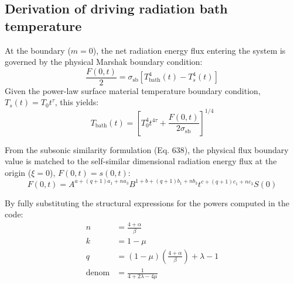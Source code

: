\documentclass[11pt]{article}
\begin{document}
\subsection*{Derivation of driving radiation bath temperature}

At the boundary ($m=0$), the net radiation energy flux entering the system is governed by the physical Marshak boundary condition:
\begin{equation}
    \frac{F(0, t)}{2} = \sigma_{\text{sb}} \left[ T_{\text{bath}}^4(t) - T_s^4(t) \right]
\end{equation}
Given the power-law surface material temperature boundary condition, $T_s(t) = T_0 t^\tau$, this yields:
\begin{equation}
    T_{\text{bath}}(t) = \left[ T_0^4 t^{4\tau} + \frac{F(0, t)}{2\sigma_{\text{sb}}} \right]^{1/4}
\end{equation}

From the subsonic similarity formulation (Eq. 638), the physical flux boundary value is matched to the self-similar dimensional radiation energy flux at the origin ($\xi = 0$), $F(0,t) = s(0,t)$:
\begin{equation}
    F(0, t) = A^{a + (q+1)a_1 + n a_3} B^{1 + b + (q+1)b_1 + n b_3} t^{c + (q+1)c_1 + n c_3} S(0)
\end{equation}

By fully substituting the structural expressions for the powers computed in the code:
\begin{align*}
    n &= \frac{4+\alpha}{\beta} \\
    k &= 1 - \mu \\
    q &= (1 - \mu)\left(\frac{4+\alpha}{\beta}\right) + \lambda - 1 \\
    \text{denom} &= \frac{1}{4 + 2\lambda - 4\mu}
\end{align*}
\end{document}
